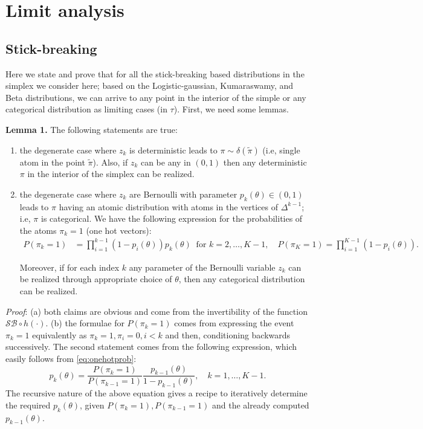 \documentclass[twoside]{article}
\begin{document}
\section{Limit analysis}
\subsection{Stick-breaking}
Here we state and prove that for all the stick-breaking based distributions in the simplex we consider here; based on the Logistic-gaussian, Kumaraswamy, and Beta distributions, we can arrive to any point in the interior of the simple or any categorical distribution as limiting cases (in $\tau$). First, we need some lemmas.


\textbf{Lemma 1.}  The following statements are true:
\begin{enumerate} \item the degenerate case where  $z_k$ is deterministic leads to $\pi\sim \delta(\tilde{\pi})$  (i.e, single atom in the point $\tilde{\pi}$). Also, if $z_k$ can be any in $(0,1)$ then any deterministic $\pi$ in the interior of the simplex can be realized.
\item the degenerate case where  $z_k$ are Bernoulli with parameter $p_k(\theta) \in (0,1)$ leads to $\pi$ having an atomic distribution with atoms in the vertices of $\Delta^{k-1}$; i.e, $\pi$ is categorical. We have the following expression for the probabilities of the atoms $\pi_k=1$ (one hot vectors):
\begin{align}
\label{eq:onehotprob}
P(\pi_k =1)&= \prod_{i=1}^{k-1} (1-p_i(\theta)) p_k(\theta)  \;\; \text{for } k=2, \ldots, K-1, \quad P(\pi_K =1) = \prod_{i=1}^{K-1} (1-p_i(\theta)).
\end{align}

Moreover, if for each index $k$ any parameter of the Bernoulli variable $z_k$ can be realized through appropriate choice of $\theta$, then any categorical distribution can be realized.

\end{enumerate}
\textit{Proof}: (a) both claims are obvious and come from the invertibility of the function $\mathcal{SB} \circ h (\cdot)$. (b) the formulae for $P(\pi_k =1)$ comes from expressing the event $\pi_k=1$ equivalently as $\pi_k=1,\pi_i=0, i<k$ and then, conditioning backwards successively. The second statement comes from the following expression, which easily follows  from \eqref{eq:onehotprob}:
$$ p_k(\theta)=\frac{P(\pi_k =1)}{P(\pi_{k-1} =1)}\frac{p_{k-1}(\theta)}{1-p_{k-1}(\theta)},\quad k =1,\ldots, K-1.$$
The recursive nature of the above equation gives a recipe to iteratively determine the required $p_k(\theta)$, given  $P(\pi_k =1), P(\pi_{k-1} =1)$ and the already computed $p_{k-1}(\theta)$.
\end{document}
